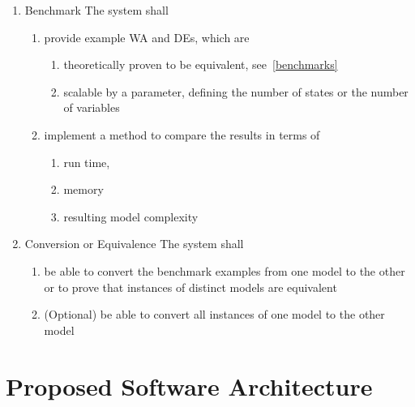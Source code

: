 \begin{enumerate}[F 1.]
                \item Benchmark
                    The system shall
                    \begin{enumerate}[1.]
                        \item provide example WA and DEs, which are
                        \begin{enumerate}[1.]
                            \item theoretically proven to be equivalent, see~\cref{benchmarks}
                            \item scalable by a parameter, defining the number of states or the number of variables
                        \end{enumerate}
                        \item implement a method to compare the results in terms of 
                        \begin{enumerate}[1.]
                            \item run time, 
                            \item memory
                            \item resulting model complexity
                        \end{enumerate}
                    \end{enumerate}
                    
                \item Conversion or Equivalence %
                    The system shall
                    \begin{enumerate}[1.]
                        \item be able to convert the benchmark examples from one model to the other or to prove that instances of distinct models are equivalent
                        \item (Optional) be able to convert all instances of one model to the other model
                    \end{enumerate}
            \end{enumerate}
    \newpage
   

    \section{Proposed Software Architecture}
